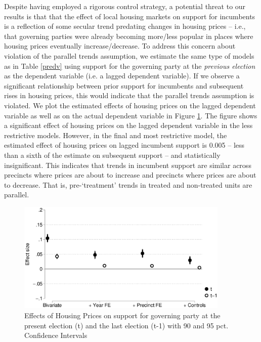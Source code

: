 \documentclass[12pt,a4paper]{article}
\begin{document}
	Despite having employed a rigorous control strategy, a potential threat to our results is that that the effect of local housing markets on support for incumbents is a reflection of some secular trend predating changes in housing prices -- i.e., that governing parties were already becoming more/less popular in places where housing prices eventually increase/decrease. To address this concern about violation of the parallel trends assumption, we estimate the same type of models as in Table \ref{predv} using support for the governing party at the \textit{previous election} as the dependent variable (i.e. a lagged dependent variable). If we observe a significant relationship between prior support for incumbents and subsequent rises in housing prices, this would indicate that the parallel trends assumption is violated. We plot the estimated effects of housing prices on the lagged dependent variable as well as on the actual dependent variable in Figure \ref{placebo}. The figure shows a significant effect of housing prices on the lagged dependent variable in the less restrictive models. However, in the final and most restrictive model, the estimated effect of housing prices on lagged incumbent support is 0.005 -- less than a sixth of the estimate on subsequent support -- and statistically insignificant. This indicates that trends in incumbent support are similar across precincts where prices are about to increase and precincts where prices  are about to decrease. That is, pre-‘treatment’ trends in treated and non-treated units are parallel.
	
	\begin{figure}[htbp!]
		\includegraphics[width=0.9\textwidth]{../figures/lagdv.eps}
		\centering
		\caption{Effects of Housing Prices on support for governing party at the present election (t) and the last election (t-1) with 90  and 95 pct. Confidence Intervals}\label{placebo}
	\end{figure}
	
\end{document}
